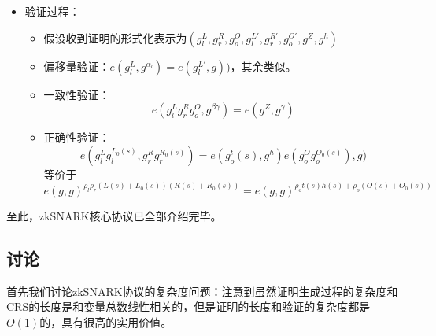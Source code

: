 \documentclass[12pt]{article}
\newcommand{\zk}{zkSNARK}
\begin{document}
\begin{itemize}
\begin{itemize}
	\end{itemize}
	\item 验证过程：
	\begin{itemize}
		\item 假设收到证明的形式化表示为$(g_l^L,g_r^R,g_o^O,g_l^{L'},g_r^{R'},g_o^{O'},g^Z,g^h)$
		\item  偏移量验证：$e(g_l^L,g^{\alpha_l})=e(g_l^{L'},g))$，其余类似。
		\item 一致性验证：
		$$e(g_l^Lg_r^Rg_o^O,g^{\beta\gamma})=e(g^Z,g^{\gamma})$$
		\item 正确性验证：
		$$e(g_l^Lg_l^{L_0(s)},g_r^Rg_r^{R_0(s)})=e(g_o^t(s),g^h)e(g_o^Og_o^{O_0(s)}),g)$$
		等价于
		$$ e(g,g)^{\rho_l\rho_r(L(s)+L_0(s))(R(s)+R_0(s))}=e(g,g)^{\rho_ot(s)h(s)+\rho_o(O(s)+O_0(s))}$$
	\end{itemize}
\end{itemize}
至此，\zk 核心协议已全部介绍完毕。
\subsection{讨论}
首先我们讨论\zk 协议的复杂度问题：注意到虽然证明生成过程的复杂度和CRS的长度是和变量总数线性相关的，但是证明的长度和验证的复杂度都是$O(1)$的，具有很高的实用价值。
\end{document}
